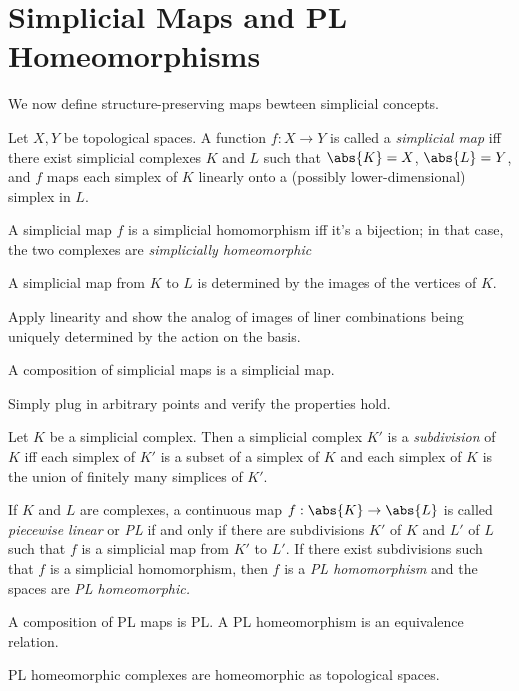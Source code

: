 \section{Simplicial Maps and PL Homeomorphisms}
We now define structure-preserving maps bewteen simplicial concepts.
\begin{definition}
  Let $X,Y$ be topological spaces. A function $f : X \to Y$ is called a
  \emph{simplicial map} iff there exist simplicial complexes $K$ and $L$ such
  that $\abs{K} = X$, $\abs{L} = Y$, and $f$ maps each simplex of $K$ linearly
  onto a (possibly lower-dimensional) simplex in $L$.
\end{definition}
\begin{definition}
  A simplicial map $f$ is a simplicial homomorphism iff it's a bijection; in
  that case, the two complexes are \emph{simplicially homeomorphic}
\end{definition}
\begin{problem}[15.17]
  A simplicial map from $K$ to $L$ is determined by the images of the vertices
  of $K$.
\end{problem}
\begin{solution}
  Apply linearity and show the analog of images of liner combinations being
  uniquely determined by the action on the basis.
\end{solution}
\begin{problem}[15.18]
  A composition of simplicial maps is a simplicial map.
\end{problem}
\begin{solution}
  Simply plug in arbitrary points and verify the properties hold.
\end{solution}
\begin{definition}[Subdivision]
  Let $K$ be a simplicial complex. Then a simplicial complex $K'$ is a
  \emph{subdivision} of $K$ iff each simplex of $K'$ is a subset of a simplex of
  $K$ and each simplex of $K$ is the union of finitely many simplices of $K'$.
\end{definition}
\begin{definition}
  If $K$ and $L$ are complexes, a continuous map $f : \abs{K} \to \abs{L}$ is
  called \emph{piecewise linear} or \emph{PL} if and only if there are
  subdivisions $K'$ of $K$ and $L'$ of $L$ such that $f$ is a simplicial map
  from $K'$ to $L'$. If there exist subdivisions such that $f$ is a simplicial
  homomorphism, then $f$ is a \emph{PL homomorphism} and the spaces are \emph{PL
  homeomorphic.}
\end{definition}
\begin{problem}[15.21]
  A composition of PL maps is PL. A PL homeomorphism is an equivalence relation.
\end{problem}
\begin{problem}[15.22]
  PL homeomorphic complexes are homeomorphic as topological spaces.
\end{problem}


